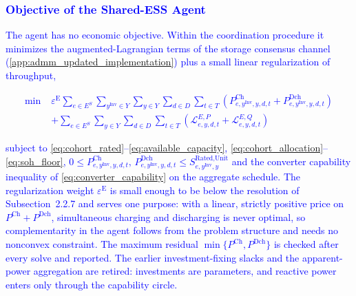 

\subsubsection{\textcolor{blue}{Objective of the Shared-ESS Agent}}

\textcolor{blue}{The agent has no economic objective. Within the coordination procedure it minimizes the
augmented-Lagrangian terms of the storage consensus channel (\ref{app:admm_updated_implementation}) plus a
small linear regularization of throughput,}

\textcolor{blue}{
    \begin{equation}
        \begin{aligned}
            \min \;
            & \varepsilon^{\text{E}} \sum_{e \in E^S} \sum_{y^\text{Inv} \in Y} \sum_{y \in Y} \sum_{d \in D} \sum_{t \in T}
            \left( P^{\text{Ch}}_{e,y^\text{Inv},y,d,t} + P^{\text{Dch}}_{e,y^\text{Inv},y,d,t} \right) \\
            & + \sum_{e \in E^S} \sum_{y \in Y} \sum_{d \in D} \sum_{t \in T}
            \left( \mathcal{L}^{E,P}_{e,y,d,t} + \mathcal{L}^{E,Q}_{e,y,d,t} \right)
        \end{aligned}
        \label{eq:esso_objective}
    \end{equation}
}

\noindent
\textcolor{blue}{subject to \eqref{eq:cohort_rated}--\eqref{eq:available_capacity},
\eqref{eq:cohort_allocation}--\eqref{eq:soh_floor}, $0 \le P^{\text{Ch}}_{e,y^\text{Inv},y,d,t},\,
P^{\text{Dch}}_{e,y^\text{Inv},y,d,t} \le S^{\text{Rated,Unit}}_{e,y^\text{Inv},y}$ and the converter capability
inequality of \eqref{eq:converter_capability} on the aggregate schedule. The regularization weight
$\varepsilon^{\text{E}}$ is small enough to be below the resolution of Subsection~2.2.7 and serves one purpose:
with a linear, strictly positive price on $P^{\text{Ch}} + P^{\text{Dch}}$, simultaneous charging and discharging
is never optimal, so complementarity in the agent follows from the problem structure and needs no
nonconvex constraint. The maximum residual $\min\{P^{\text{Ch}}, P^{\text{Dch}}\}$ is checked after every solve
and reported. The earlier investment-fixing slacks and the apparent-power aggregation are retired:
investments are parameters, and reactive power enters only through the capability circle.}

